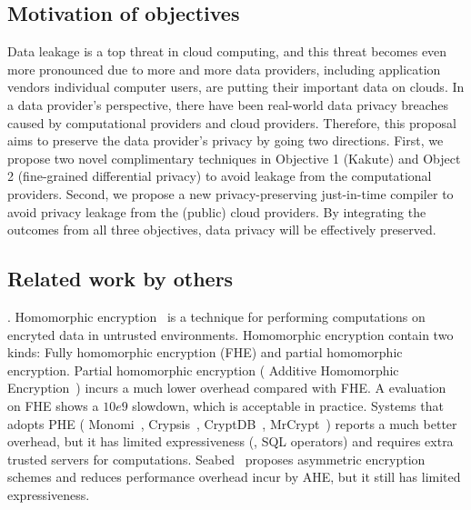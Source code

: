 \vspace{-.15in}\subsection{Motivation of objectives} 
\label{sec:motivation}\vspace{-.075in}

Data leakage is a top threat in cloud computing, and this threat becomes even 
more pronounced due to more and more data providers, including application 
vendors individual computer users, are putting their important data on clouds. 
In a data provider's perspective, there have been real-world data privacy 
breaches caused by computational providers and cloud providers. Therefore, this 
proposal aims to preserve the data provider's privacy by going two directions. 
First, we propose two novel complimentary techniques in Objective 1 (Kakute) and 
Object 2 (fine-grained differential privacy) to avoid leakage from the 
computational providers. Second, we propose a new privacy-preserving 
just-in-time compiler to avoid privacy leakage from the (public) cloud 
providers. By integrating the outcomes from all three objectives, data privacy 
will be effectively preserved.


\subsection{Related work by others} 
\label{sec:others-work}\vspace{-.075in}

. Homomorphic 
encryption~\cite{fullmomo:stoc09,paillier,elgamal} is a
technique for performing computations on encryted data in untrusted 
environments. Homomorphic encryption contain two kinds: Fully 
homomorphic encryption (FHE) and partial 
homomorphic encryption.
Partial homomorphic encryption (\eg{} Additive Homomorphic 
Encryption~\cite{paillier})
incurs a much lower overhead compared with FHE. A evaluation~\cite{homo:eval} on
FHE shows a $10e9$ slowdown, which is acceptable in practice.
Systems that adopts PHE (\eg{} Monomi~\cite{monomi:vldb13},
Crypsis~\cite{crypsis:hotcloud14}, CryptDB~\cite{cryptdb:sosp11},
MrCrypt~\cite{mrcrypt:oospsla14})
reports a much better overhead, but it has limited expressiveness
(\eg, SQL operators) and requires extra trusted servers for computations.
Seabed~\cite{seabed:osdi16} proposes asymmetric encryption schemes and reduces 
performance overhead incur by AHE, but it still has limited expressiveness.

